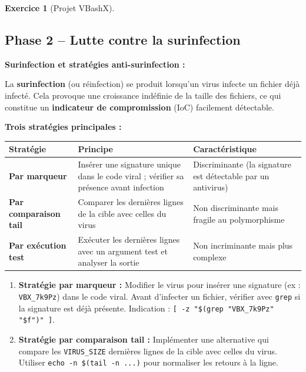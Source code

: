 \documentclass[a4paper,11pt]{article}
\theoremstyle{plain}
\theoremstyle{definition}
\newtheorem{exercice}{Exercice}
\begin{document}
\begin{exercice}[Projet VBashX]
\begin{correction}
\end{correction}



\subsection*{Phase 2 -- Lutte contre la surinfection}

\begin{rappel}
\textbf{Surinfection et stratégies anti-surinfection :}

La \textbf{surinfection} (ou réinfection) se produit lorsqu'un virus infecte un fichier déjà infecté. Cela provoque une croissance indéfinie de la taille des fichiers, ce qui constitue un \textbf{indicateur de compromission} (IoC) facilement détectable.

\medskip
\textbf{Trois stratégies principales :}

\begin{center}
\begin{tabular}{lp{5cm}p{4cm}}
\toprule
\textbf{Stratégie} & \textbf{Principe} & \textbf{Caractéristique} \\
\midrule
\textbf{Par marqueur} & Insérer une signature unique dans le code viral ; vérifier sa présence avant infection & Discriminante (la signature est détectable par un antivirus) \\
\textbf{Par comparaison tail} & Comparer les dernières lignes de la cible avec celles du virus & Non discriminante mais fragile au polymorphisme \\
\textbf{Par exécution test} & Exécuter les dernières lignes avec un argument test et analyser la sortie & Non incriminante mais plus complexe \\
\bottomrule
\end{tabular}
\end{center}
\end{rappel}

\begin{enumerate}
\item[\textbf{2a)}] \textbf{Stratégie par marqueur :} Modifier le virus pour insérer une signature (ex : \texttt{VBX\_7k9Pz}) dans le code viral. Avant d'infecter un fichier, vérifier avec \texttt{grep} si la signature est déjà présente. Indication : \texttt{[ -z "\$(grep "VBX\_7k9Pz" "\$f")" ]}.

\item[\textbf{2b)}] \textbf{Stratégie par comparaison tail :} Implémenter une alternative qui compare les \texttt{VIRUS\_SIZE} dernières lignes de la cible avec celles du virus. Utiliser \texttt{echo -n \$(tail -n ...)} pour normaliser les retours à la ligne.


\end{enumerate}
\end{exercice}
\end{document}
